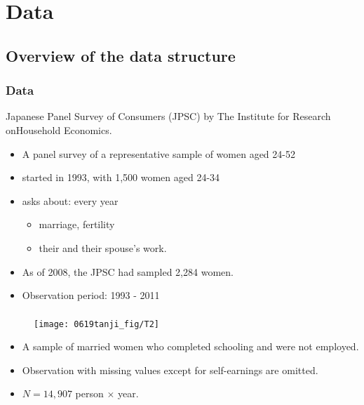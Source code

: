 \documentclass[dvipdfmx,11pt]{beamer}
\begin{document}
\section{Data}
\subsection{Overview of the data structure}

\begin{frame}\frametitle{Data}
  Japanese Panel Survey of Consumers (JPSC) by The Institute for Research onHousehold Economics.
  \begin{itemize}
    \item A panel survey of a representative sample of women aged 24-52
    \item started in 1993, with 1,500 women aged 24-34
    \item asks about: every year
    \begin{itemize}
      \item marriage, fertility
      \item their and their spouse's work.
    \end{itemize}
    \item As of 2008, the JPSC had sampled 2,284 women.
    \item Observation period: 1993 - 2011
  \end{itemize}
\end{frame}

\begin{frame}\frametitle{}
  \begin{figure}[h]
    \centering
    \texttt{[image: 0619tanji\_fig/T2]}
    \label{T2}
  \end{figure}
  \begin{itemize}
    \small
    \item A sample of married women who completed schooling and were not employed.
    \item Observation with missing values except for self-earnings are omitted.
    \item $N = 14,907$ person $\times$ year.
  \end{itemize}
\end{frame}
\end{document}
